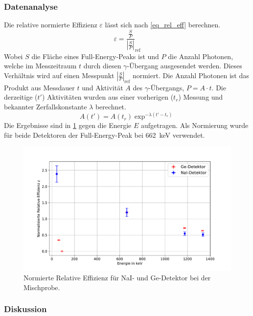 \documentclass[
	a4paper,
	12pt,
	pagesize,
	ngerman
]{scrartcl}
\begin{document}
\subsubsection{Datenanalyse}
Die relative normierte Effizienz $\varepsilon$ lässt sich nach \cref{eq_rel_eff} berechnen.
\begin{equation}
	\label{eq_rel_eff}
	\varepsilon = \frac{\frac{S}{P}}{\left|\frac{S}{P}\right|}_{\text{ref}}
\end{equation}
Wobei $S$ die Fläche eines Full-Energy-Peaks ist und $P$ die Anzahl Photonen, welche im Messzeitraum $t$ durch diesen $\gamma$-Übergang ausgesendet werden.
Dieses Verhältnis wird auf einen Messpunkt $\left|\frac{S}{P}\right|_{\text{ref}}$ normiert.
Die Anzahl Photonen ist das Produkt aus Messdauer $t$ und Aktivität $A$ des $\gamma$-Übergangs, $P=A\cdot t$.
Die derzeitige ($t'$) Aktivitäten wurden aus einer vorherigen ($t_r$) Messung und bekannter Zerfallskonstante $\lambda$ berechnet.
\begin{equation}
	A(t') = A(t_r)\exp^{-\lambda (t'-t_r)}
\end{equation}
Die Ergebnisse sind in \cref{fg_eff} gegen die Energie $E$ aufgetragen.
Als Normierung wurde für beide Detektoren der Full-Energy-Peak bei \SI{662}{keV} verwendet.

	\begin{figure}[H]
			\includegraphics[width= 1 \linewidth]{img/eff}
			\caption{
			Normierte Relative Effizienz für NaI- und Ge-Detektor bei der Mischprobe.
			}
			\label{fg_eff}
	\end{figure}

\subsubsection{Diskussion}
\end{document}

